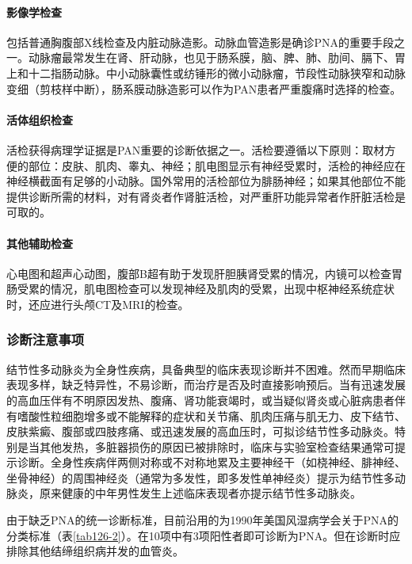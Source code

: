 \paragraph{影像学检查}

包括普通胸腹部X线检查及内脏动脉造影。动脉血管造影是确诊PNA的重要手段之一。动脉瘤最常发生在肾、肝动脉，也见于肠系膜，脑、脾、肺、肋间、膈下、胃上和十二指肠动脉。中小动脉囊性或纺锤形的微小动脉瘤，节段性动脉狭窄和动脉变细（剪枝样中断），肠系膜动脉造影可以作为PAN患者严重腹痛时选择的检查。

\paragraph{活体组织检查}

活检获得病理学证据是PAN重要的诊断依据之一。活检要遵循以下原则：取材方便的部位：皮肤、肌肉、睾丸、神经；肌电图显示有神经受累时，活检的神经应在神经横截面有足够的小动脉。国外常用的活检部位为腓肠神经；如果其他部位不能提供诊断所需的材料，对有肾炎者作肾脏活检，对严重肝功能异常者作肝脏活检是可取的。

\paragraph{其他辅助检查}

心电图和超声心动图，腹部B超有助于发现肝胆胰肾受累的情况，内镜可以检查胃肠受累的情况，肌电图检查可以发现神经及肌肉的受累，出现中枢神经系统症状时，还应进行头颅CT及MRI的检查。

\subsubsection{诊断注意事项}

结节性多动脉炎为全身性疾病，具备典型的临床表现诊断并不困难。然而早期临床表现多样，缺乏特异性，不易诊断，而治疗是否及时直接影响预后。当有迅速发展的高血压伴有不明原因发热、腹痛、肾功能衰竭时，或当疑似肾炎或心脏病患者伴有嗜酸性粒细胞增多或不能解释的症状和关节痛、肌肉压痛与肌无力、皮下结节、皮肤紫癜、腹部或四肢疼痛、或迅速发展的高血压时，可拟诊结节性多动脉炎。特别是当其他发热，多脏器损伤的原因已被排除时，临床与实验室检查结果通常可提示诊断。全身性疾病伴两侧对称或不对称地累及主要神经干（如桡神经、腓神经、坐骨神经）的周围神经炎（通常为多发性，即多发性单神经炎）提示为结节性多动脉炎，原来健康的中年男性发生上述临床表现者亦提示结节性多动脉炎。

由于缺乏PNA的统一诊断标准，目前沿用的为1990年美国风湿病学会关于PNA的分类标准（表\ref{tab126-2}）。在10项中有3项阳性者即可诊断为PNA。但在诊断时应排除其他结缔组织病并发的血管炎。


